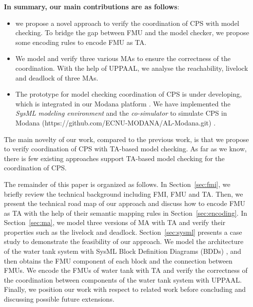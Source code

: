 \textbf{In summary, our main contributions are as follows}:
\begin{itemize}
\item
we propose a novel approach to verify the coordination of CPS with model checking. To bridge the gap between FMU and the model checker, we propose some encoding rules to encode FMU as TA.
\item
We model and verify three various MAs to ensure the correctness of the coordination. With the help of UPPAAL, we analyse the reachability, livelock and deadlock of three MAs.
\item
The prototype for model checking coordination of CPS is under developing, which is integrated in our Modana platform \cite{Cheng2015Modana}. We have implemented the \textit{SysML modeling environment} and the \textit{co-simulator} to simulate CPS in Modana (https://github.com/ECNU-MODANA/AL-Modana.git) \cite{Fritzson1998Modelica}.
\end{itemize}
The main novelty of our work, compared to the previous work, is that we propose to verify coordination of CPS with TA-based model checking. As far as we know, there is few existing approaches support TA-based model checking for the coordination of CPS.

The remainder of this paper is organized as follows. In Section~\ref{sec:fmi}, we briefly review the technical background including FMI, FMU and TA. Then, we present the technical road map of our approach and discuss how to encode FMU as TA with the help of their semantic mapping rules in Section~\ref{sec:encoding}. In Section~\ref{sec:ma}, we model three versions of MA with TA and verify their properties such as the livelock and deadlock. Section~\ref{sec:sysml} presents a case study to demonstrate the feasibility of our approach. We model the architecture of the water tank system with SysML Block Definition Diagrams (BDDs) \cite{SemerathBHSV17}, and then obtains the FMU component of each block and the connection between FMUs. We encode the FMUs of water tank with TA and verify the correctness of the coordination between components of the water tank system with UPPAAL. Finally, we position our work with respect to related work before concluding and discussing possible future extensions.




















